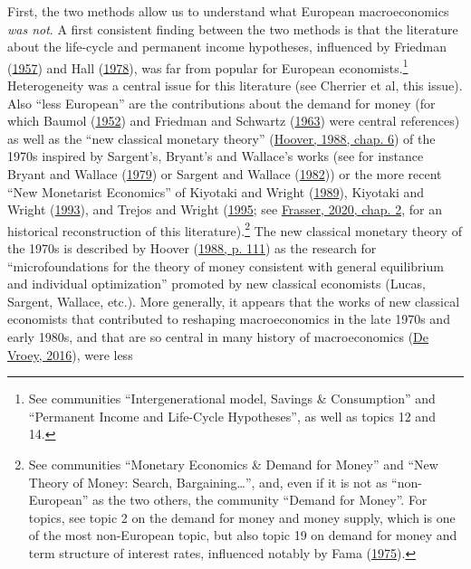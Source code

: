 \documentclass[]{elsarticle} %
\begin{document}
First, the two methods allow us to understand what European
macroeconomics \emph{was not}. A first consistent finding between the
two methods is that the literature about the life-cycle and permanent
income hypotheses, influenced by Friedman
(\protect\hyperlink{ref-friedman1957}{1957}) and Hall
(\protect\hyperlink{ref-hall1978b}{1978}), was far from popular for
European economists.\footnote{See communities ``Intergenerational model,
  Savings \& Consumption'' and ``Permanent Income and Life-Cycle
  Hypotheses'', as well as topics 12 and 14.} Heterogeneity was a
central issue for this literature (see Cherrier et al, this issue). Also
``less European'' are the contributions about the demand for money (for
which Baumol (\protect\hyperlink{ref-baumol1952}{1952}) and Friedman and
Schwartz (\protect\hyperlink{ref-friedman1963}{1963}) were central
references) as well as the ``new classical monetary theory''
(\protect\hyperlink{ref-hoover1988}{Hoover, 1988, chap. 6}) of the 1970s
inspired by Sargent's, Bryant's and Wallace's works (see for instance
Bryant and Wallace (\protect\hyperlink{ref-bryant1979}{1979}) or Sargent
and Wallace (\protect\hyperlink{ref-sargent1982}{1982})) or the more
recent ``New Monetarist Economics'' of Kiyotaki and Wright
(\protect\hyperlink{ref-kiyotaki1989}{1989}), Kiyotaki and Wright
(\protect\hyperlink{ref-kiyotaki1993}{1993}), and Trejos and Wright
(\protect\hyperlink{ref-trejos1995}{1995}; see
\protect\hyperlink{ref-frasser2020}{Frasser, 2020, chap. 2}, for an
historical reconstruction of this literature).\footnote{See communities
  ``Monetary Economics \& Demand for Money'' and ``New Theory of Money:
  Search, Bargaining\ldots{}'', and, even if it is not as
  ``non-European'' as the two others, the community ``Demand for
  Money''. For topics, see topic 2 on the demand for money and money
  supply, which is one of the most non-European topic, but also topic 19
  on demand for money and term structure of interest rates, influenced
  notably by Fama (\protect\hyperlink{ref-fama1975}{1975}).} The new
classical monetary theory of the 1970s is described by Hoover
(\protect\hyperlink{ref-hoover1988}{1988, p. 111}) as the research for
``microfoundations for the theory of money consistent with general
equilibrium and individual optimization'' promoted by new classical
economists (Lucas, Sargent, Wallace, etc.). More generally, it appears
that the works of new classical economists that contributed to reshaping
macroeconomics in the late 1970s and early 1980s, and that are so
central in many history of macroeconomics
(\protect\hyperlink{ref-devroey2016}{De Vroey, 2016}), were less
\end{document}
